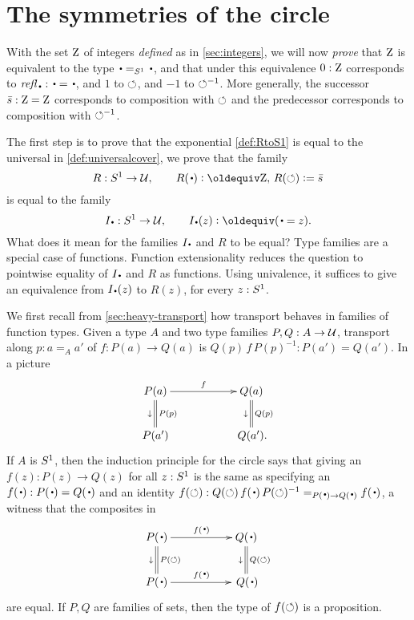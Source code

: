 \section{The symmetries of the circle}
\label{sec:pi1S1isZ}\label{sec:symcirc}

With the set $\mathrm{Z}$ of integers \emph{defined} as in \cref{sec:integers}, 
we will now \emph{prove} that $\mathrm{Z}$ is equivalent to the type 
$\base=_{\Sc}\base$, and that under this equivalence $0:\mathrm{Z}$ corresponds to 
$\refl{\base}:\base=\base$, and $1$ to $\circlearrowleft$, and $-1$ to $\circlearrowleft^{-1}$. 
More generally, the successor $\bar {s}:\mathrm{Z}=\mathrm{Z}$ corresponds to composition with $\circlearrowleft$
and the predecessor corresponds to composition with $\circlearrowleft^{-1}$.

The first step is to prove that the exponential \covering \cref{def:RtoS1} 
is equal to the universal \covering in \cref{def:universalcover}, 
\ie we prove that the family 
\[
R: \Sc\to\UU,\qquad R(\base)\defeq\zet,\, R(\Sloop)\defis \etop{s}
\]
is equal to the family
\[
\uc{\base}:\Sc\to\UU,\qquad \uc{\base}(z)\defeq (\base=z).
\]
What does it mean for the families $\uc{\base}$ and $R$ to be equal?
Type families are a special case of functions. 
Function extensionality reduces the question to pointwise equality
of $\uc{\base}$ and $R$ as functions.
Using univalence, it suffices to give
an equivalence from $\uc{\base}(z)$ to $R(z)$, for every $z:{S^1}$.


We first recall from \cref{sec:heavy-transport} how 
transport behaves in families of function types.  
Given a type $A$ and two type families $P,Q:A\to\mathcal{U}$, 
transport along $p:a=_Aa'$ of $f:P(a)\to Q(a)$ is $Q(p)\,f\,P(p)^{-1}:P(a')=Q(a')$.
In a picture
\[
\xymatrix{
P(a)\ar[rr]^{f}\ar@{=}[d]^{P(p)}_\downarrow&&
  Q(a)\ar@{=}[d]^{Q(p)}_\downarrow\\
P(a')&&\,Q(a').}
\]
If $A$ is ${S^1}$, then the induction principle for the circle says 
that giving an $f(z):P(z)\to Q(z)$ for all $z:{S^1}$ is the same as 
specifying an $f(\base):P(\base)=Q(\base)$ and an identity 
$f(\Sloop):Q(\Sloop)\,f(\base)\,P(\Sloop)^{-1}=_{P(\base)\to Q(\base)}f(\base)$,
\ie a witness that the composites in 
$$\xymatrix{
  P(\base)\ar[rr]^{f(\base)}\ar@{=}[d]^{P(\Sloop)}_\downarrow
 &&Q(\base)\ar@{=}[d]^{Q(\Sloop)}_\downarrow\\
  P(\base)\ar[rr]^{f(\base)}&&\,Q(\base)}
$$
are equal.  If $P,Q$ are families of sets, 
then the type of $f(\circlearrowleft)$ is a proposition.

